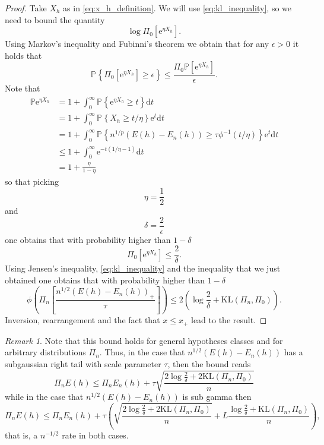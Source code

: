 \documentclass{uvamath}
\newcommand*{\bbP}{\mathbb{P}}
\newcommand*{\prob}[2][]{\mathbb{P}_{#1}\left\{#2\right\}}
\newcommand*{\sqbrack}[1]{\left[#1\right]}
\newcommand*{\paren}[1]{\left(#1\right)}
\newcommand*{\rme}{\mathrm{e}}
\newcommand*{\rmd}{\mathrm{d}}
\newcommand*{\KL}{\mathrm{KL}}
\theoremstyle{remark}
\newtheorem{remark}[theorem]{Remark}
\theoremstyle{definition}
\theoremstyle{definition}
\theoremstyle{definition}
\theoremstyle{definition}
\theoremstyle{definition}
\begin{document}
\begin{proof}
  Take $X_h$ as in \eqref{eq:x_h_definition}. We will use
  \eqref{eq:kl_inequality}, so we need to bound the quantity
  \begin{equation*}
    \log\Pi_0[\rme^{\eta X_h}].
  \end{equation*}
  Using Markov's inequality and Fubinni's theorem we obtain that for
  any $\epsilon>0$ it holds that
  \begin{equation*}
    \prob{\Pi_0[\rme^{\eta X_h}] \geq \epsilon} \leq
    \frac{\Pi_0\bbP[\rme^{\eta X_h}]}{\epsilon}.
  \end{equation*}
  Note that
  \begin{align*}
    \bbP\rme^{\eta X_h}
    &= 1 + \int_{0}^{\infty}\prob{\rme^{\eta X_h} \geq t}\rmd t\\
    &= 1 + \int_{0}^{\infty}\prob{ X_h \geq t/\eta}\rme^{t}\rmd t\\
    &= 1 + \int_{0}^{\infty}\prob{ n^{1/p}(E(h)-E_n(h)) \geq \tau\phi^{-1}(t /
      \eta)}\rme^t \rmd t\\
    &\leq 1 + \int_0^\infty\rme^{-t(1/\eta - 1)}\rmd t\\
    &= 1 + \frac{\eta}{1-\eta}
  \end{align*}
so that picking
\begin{equation*}
  \eta = \frac{1}{2}
\end{equation*}
and
\begin{equation*}
  \delta = \frac{2}{\epsilon}
\end{equation*}
one obtains that with probability higher than $1-\delta$
\begin{equation*}
  \Pi_0[\rme^{\eta X_h}] \leq \frac{2}{\delta}.
\end{equation*}
Using Jensen's inequality, \eqref{eq:kl_inequality} and the inequality
that we just obtained one obtains that with probability higher than
$1-\delta$
\begin{equation*}
  \phi\paren{\Pi_n\sqbrack{\frac{n^{1/2}(E(h) - E_n(h))_{+}}{\tau}}} \leq 2\paren{\log\frac{2}{\delta} + \KL(\Pi_n, \Pi_0)}.
\end{equation*}
Inversion, rearrangement and the fact that $x\leq x_+$ lead to the
result.
\end{proof}
\begin{remark}
  Note that this bound holds for general hypotheses classes and for
  arbitrary distributions $\Pi_n$. Thus, in the case that
  $n^{1/2}(E(h)-E_{n}(h))$ has a subgaussian right tail with scale
  parameter $\tau$, then the bound reads
  \begin{equation*}
    \Pi_nE(h) \leq \Pi_nE_n(h) +
    \tau\sqrt{\frac{2\log\frac{2}{\delta} +
      2\KL(\Pi_n,\Pi_0)}{n}}
  \end{equation*}
  while in the case that $n^{1/2}(E(h)-E_{n}(h))$ is sub gamma then
  \begin{equation*}
    \Pi_nE(h) \leq \Pi_nE_n(h) +
    \tau\paren{\sqrt{\frac{2\log\frac{2}{\delta} +
        2\KL(\Pi_n,\Pi_0)}{n}} + L\frac{\log\frac{2}{\delta} +
      \KL(\Pi_n,\Pi_0)}{n}},
  \end{equation*}
  that is, a $n^{-1/2}$ rate in both cases.
\end{remark}
\end{document}
